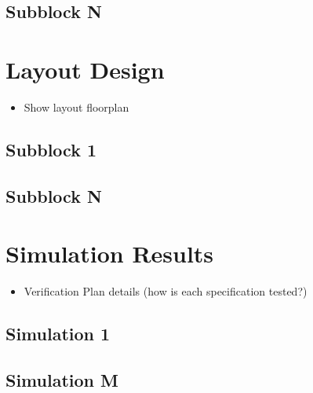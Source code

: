 \documentclass{article}
\begin{document}
\subsection{Subblock N}

\newpage

\section{Layout Design}

\begin{itemize}
    \item Show layout floorplan
\end{itemize}

\subsection{Subblock 1}

\subsection{Subblock N}

\newpage

\section{Simulation Results}

\begin{itemize}
    \item Verification Plan details (how is each specification tested?)
\end{itemize}

\subsection{Simulation 1}

\subsection{Simulation M}

\newpage



\end{document}
